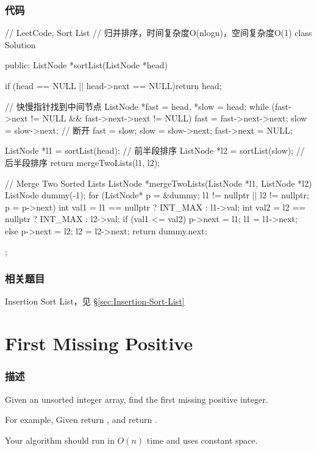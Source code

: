 \subsubsection{代码}
\begin{Code}
	// LeetCode, Sort List
	// 归并排序，时间复杂度O(nlogn)，空间复杂度O(1)
	class Solution {
		public:
		ListNode *sortList(ListNode *head) {
			if (head == NULL || head->next == NULL)return head;
			
			// 快慢指针找到中间节点
			ListNode *fast = head, *slow = head;
			while (fast->next != NULL && fast->next->next != NULL) {
				fast = fast->next->next;
				slow = slow->next;
			}
			// 断开
			fast = slow;
			slow = slow->next;
			fast->next = NULL;
			
			ListNode *l1 = sortList(head);  // 前半段排序
			ListNode *l2 = sortList(slow);  // 后半段排序
			return mergeTwoLists(l1, l2);
		}
		
		// Merge Two Sorted Lists
		ListNode *mergeTwoLists(ListNode *l1, ListNode *l2) {
			ListNode dummy(-1);
			for (ListNode* p = &dummy; l1 != nullptr || l2 != nullptr; p = p->next) {
				int val1 = l1 == nullptr ? INT_MAX : l1->val;
				int val2 = l2 == nullptr ? INT_MAX : l2->val;
				if (val1 <= val2) {
					p->next = l1;
					l1 = l1->next;
				} else {
				p->next = l2;
				l2 = l2->next;
			}
		}
		return dummy.next;
	}
};
\end{Code}


\subsubsection{相关题目}
\begindot
\item Insertion Sort List，见 \S \ref{sec:Insertion-Sort-List}
\myenddot


\section{First Missing Positive} %
\label{sec:first-missing-positive}


\subsubsection{描述}
Given an unsorted integer array, find the first missing positive integer.

For example,
Given \fn{[1,2,0]} return ,
and \fn{[3,4,-1,1]} return .

Your algorithm should run in $O(n)$ time and uses constant space.



